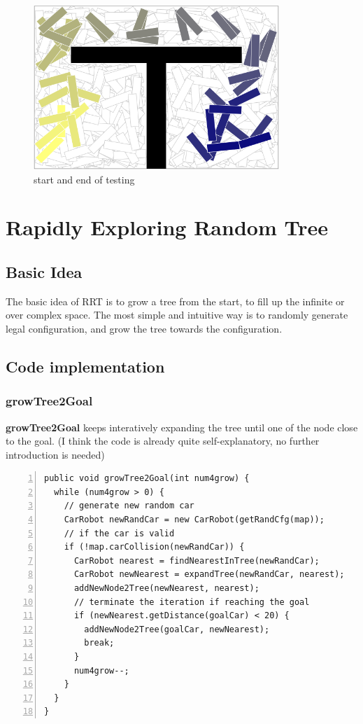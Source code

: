\documentclass{article}
\begin{document}
\begin{figure}[!h]
\centering
\includegraphics[width=0.827\textwidth]{1-2.png}
\caption{start and end of testing}
\label{1-2}
\end{figure}






\clearpage
\section{Rapidly Exploring Random Tree}
\subsection{Basic Idea}
The basic idea of RRT is to grow a tree from the start, to fill up the infinite or over complex space. The most simple and intuitive way is to randomly generate legal configuration, and grow the tree towards the configuration. 





\subsection{Code implementation}


\subsubsection{growTree2Goal}

\textbf{growTree2Goal} keeps interatively expanding the tree until one of the node close to the goal. (I think the code is already quite self-explanatory, no further introduction is needed) 

\begin{lstlisting}[numbers=left]
public void growTree2Goal(int num4grow) {
  while (num4grow > 0) {
    // generate new random car
    CarRobot newRandCar = new CarRobot(getRandCfg(map));
    // if the car is valid
    if (!map.carCollision(newRandCar)) {
      CarRobot nearest = findNearestInTree(newRandCar);
      CarRobot newNearest = expandTree(newRandCar, nearest);
      addNewNode2Tree(newNearest, nearest);
      // terminate the iteration if reaching the goal
      if (newNearest.getDistance(goalCar) < 20) {
        addNewNode2Tree(goalCar, newNearest);
        break;
      }
      num4grow--;
    }
  }
}
\end{lstlisting}
\end{document}
